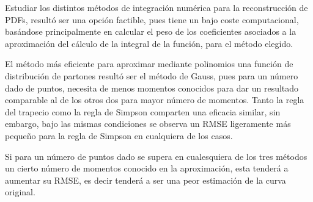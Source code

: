 \documentclass[titlepage,11pt]{report}
\begin{document}
Estudiar los distintos métodos de integración numérica para la reconstrucción de PDFs, resultó ser una opción factible, pues tiene un bajo coste computacional, basándose principalmente en calcular el peso de los coeficientes asociados a la aproximación del cálculo de la integral de la función, para el método elegido.

 El método más eficiente para aproximar mediante polinomios una función de distribución de partones resultó ser el método de Gauss, pues para un número dado de puntos, necesita de menos momentos conocidos para dar un resultado comparable al de los otros dos para mayor número de momentos. Tanto la regla del trapecio como la regla de Simpson comparten una eficacia similar, sin embargo, bajo las mismas condiciones se observa un RMSE ligeramente más pequeño para la regla de Simpson en cualquiera de los casos.

Si para un número de puntos dado se supera en cualesquiera de los tres métodos un cierto número de momentos conocido en la aproximación, esta tenderá a aumentar su RMSE, es decir tenderá a ser una peor estimación de la curva original.


\nocite{*}

\end{document}
